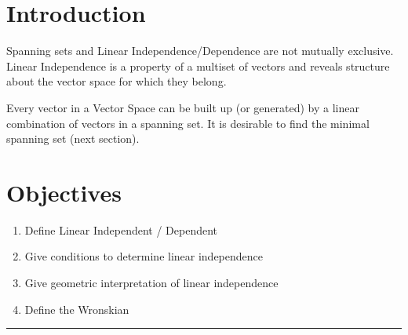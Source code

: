 %
\section*{Introduction}

Spanning sets and Linear Independence/Dependence are not mutually exclusive.  Linear Independence is a property of a multiset of vectors and reveals structure about the vector space for which they belong.

Every vector in a Vector Space can be built up (or generated) by a linear combination of vectors in a spanning set.  It is desirable to find the minimal spanning set (next section).


\section*{Objectives}
\begin{enumerate}
	\item Define Linear Independent / Dependent
	\item Give conditions to determine linear independence
	\item Give geometric interpretation of linear independence
	\item Define the Wronskian
    
\end{enumerate}



 
 
  

\rule[0.01in]{\textwidth}{0.0025in}


